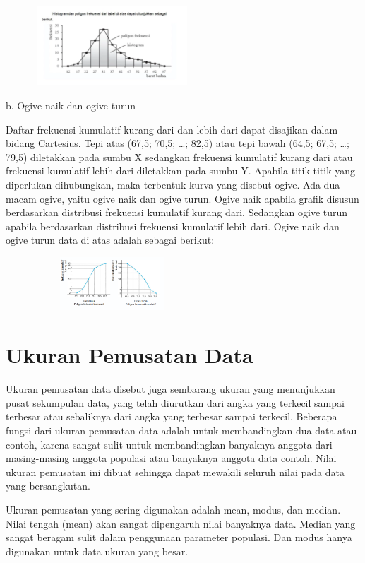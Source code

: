 \documentclass[11pt,fleqn]{book} %
\begin{document}
{\includegraphics[width = 8cm, height= 3cm]{Pictures/16reska.png}



b. Ogive naik dan ogive turun

Daftar frekuensi kumulatif kurang dari dan lebih dari dapat disajikan dalam bidang
Cartesius. 
Tepi atas (67,5; 70,5; …; 82,5) atau tepi bawah (64,5; 67,5; …; 79,5)
diletakkan pada sumbu X sedangkan frekuensi kumulatif kurang dari atau frekuensi
kumulatif lebih dari diletakkan pada sumbu Y.
Apabila titik-titik yang diperlukan
dihubungkan, maka terbentuk kurva yang disebut ogive. Ada dua macam ogive,
yaitu ogive naik dan ogive turun. Ogive naik apabila grafik disusun berdasarkan
distribusi frekuensi kumulatif kurang dari. Sedangkan ogive turun apabila berdasarkan
distribusi frekuensi kumulatif lebih dari.
Ogive naik dan ogive turun data di atas adalah
sebagai berikut:


\includegraphics[width = 8cm, height= 2cm]{Pictures/14reska.png}



\section{Ukuran Pemusatan Data}

Ukuran pemusatan data disebut juga sembarang ukuran yang menunjukkan pusat sekumpulan data, yang telah diurutkan dari angka yang terkecil sampai terbesar atau sebaliknya dari angka yang terbesar sampai terkecil. Beberapa fungsi dari ukuran pemusatan data adalah untuk membandingkan dua data atau contoh, karena sangat sulit untuk membandingkan banyaknya anggota dari masing-masing anggota populasi atau banyaknya anggota data contoh. Nilai ukuran pemusatan ini dibuat sehingga dapat mewakili seluruh nilai pada data yang bersangkutan.

Ukuran pemusatan yang sering digunakan adalah mean, modus, dan median. Nilai tengah (mean) akan sangat dipengaruh nilai banyaknya data. Median yang sangat beragam sulit dalam penggunaan parameter populasi. Dan modus hanya digunakan untuk data ukuran yang besar.

}
\end{document}
